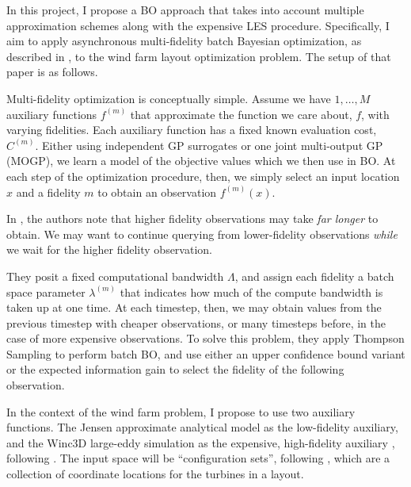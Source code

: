 \documentclass[12pt]{article}
\begin{document}
In this project, I propose a BO approach that takes into account multiple
approximation schemes along with the expensive LES procedure. Specifically, I
aim to apply asynchronous multi-fidelity batch Bayesian optimization, as
described in \cite{folchCombiningMultiFidelityModelling2023}, to the wind farm
layout optimization problem. The setup of that paper is as follows.

Multi-fidelity optimization is conceptually simple. Assume we have $1, \ldots,
M$ auxiliary functions $f^{(m)}$ that approximate the function we care about,
$f$, with varying fidelities. Each auxiliary function has a fixed known
evaluation cost, $C^{(m)}$. Either using independent GP surrogates or one joint
multi-output GP (MOGP), we learn a model of the objective values which we then
use in BO. At each step of the optimization procedure, then, we simply select
an input location $x$ and a fidelity $m$ to obtain an observation $f^{(m)}(x)$.

In \cite{folchCombiningMultiFidelityModelling2023}, the authors note that
higher fidelity observations may take \emph{far longer} to obtain. We may want
to continue querying from lower-fidelity observations \emph{while} we wait for
the higher fidelity observation. 

They posit a fixed computational bandwidth
$\Lambda$, and assign each fidelity a batch space parameter $\lambda^{(m)}$
that indicates how much of the compute bandwidth is taken up at one time. At
each timestep, then, we may obtain values from the previous timestep with
cheaper observations, or many timesteps before, in the case of more expensive
observations. To solve this problem, they apply Thompson Sampling to perform
batch BO, and use either an upper confidence bound variant or the expected
information gain to select the fidelity of the following observation.

In the context of the wind farm problem, I propose to use two auxiliary
functions. The Jensen approximate analytical model as the low-fidelity
auxiliary, and the Winc3D large-eddy simulation as the expensive, high-fidelity
auxiliary \cite{deskosWInc3DNovelFramework2020}, following
\cite{moleMultiFidelityBayesianOptimisation2024}. The input space will be
``configuration sets'', following \cite{chughWindFarmLayout2022}, which are a
collection of coordinate locations for the turbines in a layout.

\newpage



\end{document}
